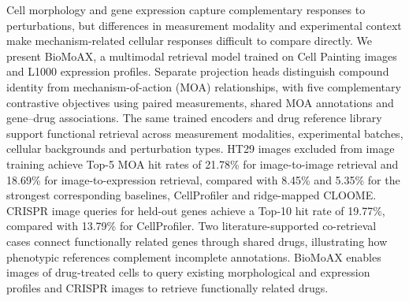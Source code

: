 Cell morphology and gene expression capture complementary responses to perturbations, but differences in measurement modality and experimental context make mechanism-related cellular responses difficult to compare directly. We present BioMoAX, a multimodal retrieval model trained on Cell Painting images and L1000 expression profiles. Separate projection heads distinguish compound identity from mechanism-of-action (MOA) relationships, with five complementary contrastive objectives using paired measurements, shared MOA annotations and gene--drug associations. The same trained encoders and drug reference library support functional retrieval across measurement modalities, experimental batches, cellular backgrounds and perturbation types. HT29 images excluded from image training achieve Top-5 MOA hit rates of 21.78\% for image-to-image retrieval and 18.69\% for image-to-expression retrieval, compared with 8.45\% and 5.35\% for the strongest corresponding baselines, CellProfiler and ridge-mapped CLOOME. CRISPR image queries for held-out genes achieve a Top-10 hit rate of 19.77\%, compared with 13.79\% for CellProfiler. Two literature-supported co-retrieval cases connect functionally related genes through shared drugs, illustrating how phenotypic references complement incomplete annotations. BioMoAX enables images of drug-treated cells to query existing morphological and expression profiles and CRISPR images to retrieve functionally related drugs.
